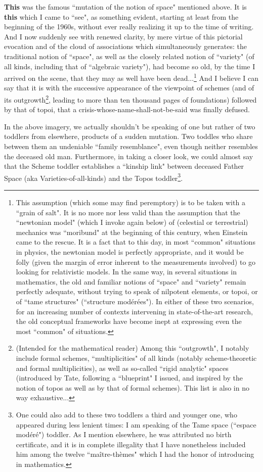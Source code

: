 \textbf{This} was the famous ``mutation of the notion of space" mentioned above. It is \textbf{this} which I came to ``see", as something evident, starting at least from the beginning of the 1960s, without ever really realizing it up to the time of writing. And I now suddenly see with renewed clarity, by mere virtue of this pictorial evocation and of the cloud of associations which simultaneously generates: the traditional notion of ``space", as well as the closely related notion of ``variety" (of all kinds, including that of ``algebraic variety"), had become so old, by the time I arrived on the scene, that they may as well have been dead...\footnote{This assumption (which some may find peremptory) is to be taken with a ``grain of salt". It is no more nor less valid than the assumption that the ``newtonian model" (which I invoke again below) of (celestial or terrestrial) mechanics was ``moribund" at the beginning of this century, when Einstein came to the rescue. It is a fact that to this day, in most ``common" situations in physics, the newtonian model is perfectly appropriate, and it would be folly (given the margin of error inherent to the measurements involved) to go looking for relativistic models. In the same way, in several situations in mathematics, the old and familiar notions of ``space" and ``variety" remain perfectly adequate, without trying to speak of nilpotent elements, or topoi, or of ``tame structures" (``structure mod\'er\'ees"). In either of these two scenarios, for an increasing number of contexts intervening in state-of-the-art research, the old conceptual frameworks have become inept at expressing even the most ``common" of situations.} And I believe I can say that it is with the successive appearance of the viewpoint of schemes (and of its outgrowth\footnote{(Intended for the mathematical reader) Among this ``outgrowth", I notably include formal schemes, ``multiplicities" of all kinds (notably scheme-theoretic and formal multiplicities), as well as so-called ``rigid analytic" spaces (introduced by Tate, following a ``blueprint" I issued, and inspired by the notion of topos as well as by that of formal schemes). This list is also in no way exhaustive...}, leading to more than ten thousand pages of foundations) followed by that of topoi, that a crisis-whose-name-shall-not-be-said was finally defused.

In the above imagery, we actually shouldn't be speaking of one but rather of two toddlers from elsewhere, products of a sudden mutation. Two toddles who share between them an undeniable ``family resemblance", even though neither resembles the deceased old man. Furthermore, in taking a closer look, we could almost say that the Scheme toddler establishes a ``kinship link" between deceased Father Space (aka Varieties-of-all-kinds) and the Topos toddler\footnote{One could also add to these two toddlers a third and younger one, who appeared during less lenient times: I am speaking of the Tame space (``espace mod\'er\'e") toddler. As I mention elsewhere, he was attributed no birth certificate, and it is in complete illegality that I have nonetheless included him among the twelve ``ma\^itre-th\`emes" which I had the honor of introducing in mathematics.}.

